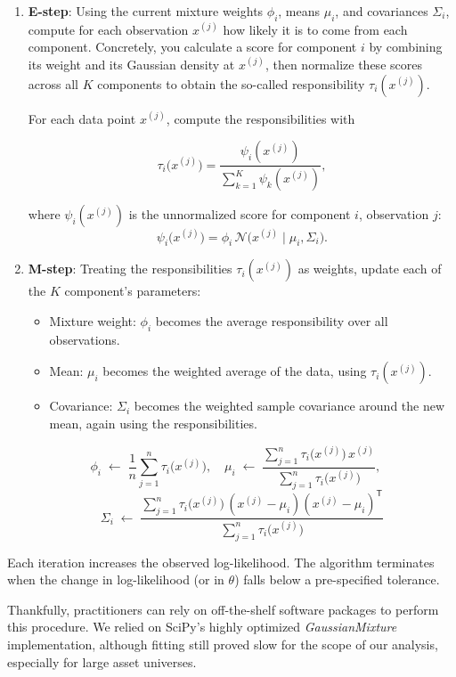 \begin{enumerate}
\item \textbf{E-step}: Using the current mixture weights $\phi_i$, means $\mu_i$, and covariances $\Sigma_i$, compute for each observation $x^{(j)}$ how likely it is to come from each component. Concretely, you calculate a score for component $i$ by combining its weight and its Gaussian density at $x^{(j)}$, then normalize these scores across all $K$ components to obtain the so-called responsibility $\tau_i(x^{(j)})$.

For each data point $x^{(j)}$, compute the responsibilities with

$$
\tau_i\bigl(x^{(j)}\bigr)
= \frac{\psi_i(x^{(j)})}
{\sum_{k=1}^K \!\psi_k(x^{(j)})},
$$

where $\psi_i(x^{(j)})$ is the unnormalized score for component $i$, observation $j$:
$$
\psi_i\bigl(x^{(j)}\bigr)=
\phi_i\,\mathcal{N}\bigl(x^{(j)}\mid\mu_i,\Sigma_i\bigr).
$$ 
\item \textbf{M-step}: Treating the responsibilities $\tau_i(x^{(j)})$ as weights, update each of the $K$ component's parameters: 
  \begin{itemize}
    \item Mixture weight: $\phi_i$ becomes the average responsibility over all observations. 
    \item Mean: $\mu_i$ becomes the weighted average of the data, using $\tau_i(x^{(j)})$.
    \item Covariance: $\Sigma_i$ becomes the weighted sample covariance around the new mean, again using the responsibilities.
  \end{itemize}
$$
\phi_i \;\leftarrow\;
\frac{1}{n}\sum_{j=1}^n 
\tau_i\bigl(x^{(j)}\bigr),
\quad
\mu_i \;\leftarrow\;
\frac{\sum_{j=1}^n 
\tau_i\bigl(x^{(j)}\bigr)\,
x^{(j)}}{\sum_{j=1}^n 
\tau_i\bigl(x^{(j)}\bigr)},
\quad
$$
$$
\Sigma_i \;\leftarrow\;
\frac{\sum_{j=1}^n 
\tau_i\bigl(x^{(j)}\bigr)\,
(x^{(j)}-\mu_i)(x^{(j)}-\mu_i)^{\!\mathsf{T}}}
{\sum_{j=1}^n 
\tau_i\bigl(x^{(j)}\bigr)}
$$
\end{enumerate}

Each iteration increases the observed log-likelihood. The algorithm terminates when the change in log-likelihood (or in $\theta$) falls below a pre-specified tolerance.

Thankfully, practitioners can rely on off-the-shelf software packages to perform this procedure. We relied on SciPy's highly optimized \textit{GaussianMixture} implementation, although fitting still proved slow for the scope of our analysis, especially for large asset universes.

